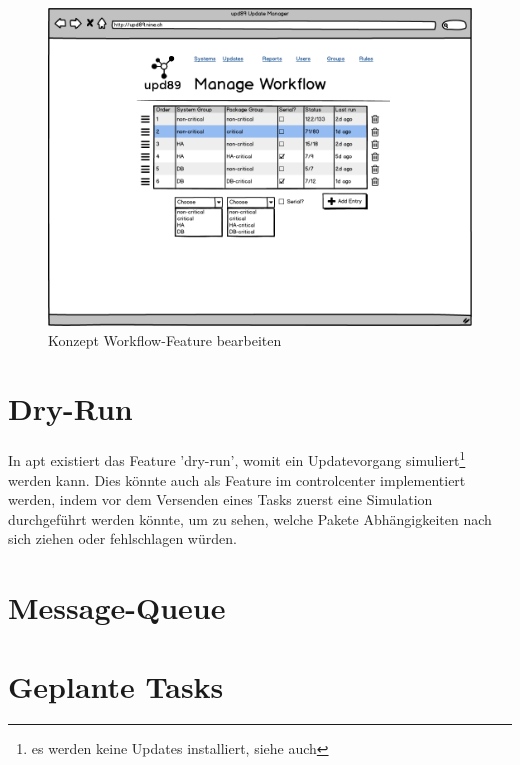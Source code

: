 \begin{figure}[H]
	\centering
	\includegraphics[width=\linewidth]{files/mockups/workflow_CRUD}
	\caption{Konzept Workflow-Feature bearbeiten}
	\label{fig:ausblick:workflow_crud}
\end{figure}


\section{Dry-Run}

In \gls{apt} existiert das Feature 'dry-run', womit ein Updatevorgang simuliert\footnote{es werden keine Updates installiert, siehe auch } werden kann. Dies könnte auch als Feature im \gls{controlcenter} implementiert werden, indem vor dem Versenden eines Tasks zuerst eine Simulation durchgeführt werden könnte, um zu sehen, welche Pakete Abhängigkeiten nach sich ziehen oder fehlschlagen würden.

\section{Message-Queue}
\label{sec:ausblick:message_queue}


\section{Geplante Tasks}
\label{sec:ausblick:scheduled_tasks}

